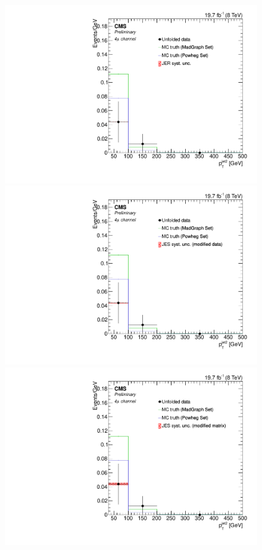 \begin{figure}[hbtp]
\begin{center}
   \includegraphics[width=0.8\cmsFigWidth]{Figures/Unfolding/Systematics/ZZTo4m_PtJet2_JER_Mad_fr}
   \includegraphics[width=0.8\cmsFigWidth]{Figures/Unfolding/Systematics/ZZTo4m_PtJet2_JES_ModData_Mad_fr}     
   \includegraphics[width=0.8\cmsFigWidth]{Figures/Unfolding/Systematics/ZZTo4m_PtJet2_JES_ModMat_Mad_fr}

\end{center}
\end{figure}
